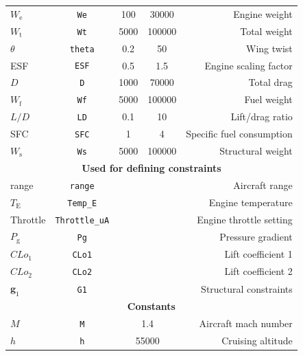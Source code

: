 \documentclass[11pt]{article}
\begin{document}
\begin{table}[h!]
\begin{tabular}{lcccr}
    $W_{\text{e}}$ 			    & \texttt{We}           & 100             & 30000  		      & Engine weight             \\
    $W_{\text{t}}$		      & \texttt{Wt}           & 5000            & 100000    		  & Total weight              \\
    $\theta$ 		            & \texttt{theta}        & 0.2             & 50    		  	  & Wing twist                \\
    ESF 		                & \texttt{ESF}          & 0.5             & 1.5    		  	  & Engine scaling factor     \\
    $D$ 		                & \texttt{D}            & 1000            & 70000	  	      & Total drag                \\
    $W_{\text{f}}$ 		      & \texttt{Wf}           & 5000            & 100000    		  & Fuel weight               \\
    $L/D$ 		              & \texttt{LD}           & 0.1             & 10    		  	  & Lift/drag ratio           \\
    SFC 		                & \texttt{SFC}          & 1               & 4    		  	    & Specific fuel consumption \\
    $W_{\text{s}}$ 		      & \texttt{Ws}           & 5000            & 100000    		  & Structural weight         \\ \hline
    \multicolumn{5}{c}{\bf Used for defining constraints}                                                           \\ \hline
    range 		              & \texttt{range}        &                 &            		  & Aircraft range            \\
    $T_{\text{E}}$ 		      & \texttt{Temp\_E}      &                 &            		  & Engine temperature        \\
    Throttle 		            & \texttt{Throttle\_uA} &                 &            		  & Engine throttle setting   \\
    $P_{\text{g}}$ 		      & \texttt{Pg}           &                 &            		  & Pressure gradient         \\
    $CLo_{1}$ 		          & \texttt{CLo1}         &                 &            		  & Lift coefficient 1        \\
    $CLo_{2}$ 		          & \texttt{CLo2}         &                 &            		  & Lift coefficient 2        \\
    $\mathbf{g}_1$ 		      & \texttt{G1}           &                 &            		  & Structural constraints    \\ \hline
    \multicolumn{5}{c}{\bf Constants}                                                                               \\ \hline
    $M$ 		                & \texttt{M}            & \multicolumn{2}{c}{1.4}           & Aircraft mach number      \\
    $h$ 		                & \texttt{h}            & \multicolumn{2}{c}{55000}         & Cruising altitude         \\
    \hline\hline
  \end{tabular}
\end{table}
\end{document}
